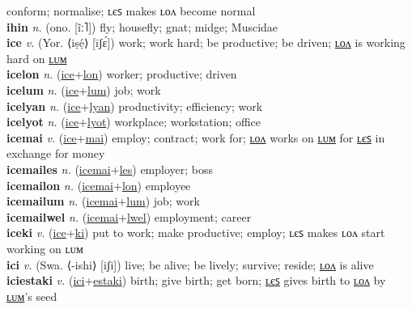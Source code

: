 conform; normalise; ʟєꜱ makes ʟᴏᴧ become normal \label{ihohaki} \\
\textbf{ihin} \textit{n.} (ono. [ĩː˥])
fly; housefly; gnat; midge; Muscidae \label{ihin} \\
\textbf{ice} \textit{v.} (Yor. ⟨iṣẹ́⟩ [īʃɛ́])
work; work hard; be productive; be driven; \hyperref[icelon]{ʟᴏᴧ} is working hard on \hyperref[icelum]{ʟᴜᴍ} \label{ice} \\
\textbf{icelon} \textit{n.} (\hyperref[ice]{ice}+\hyperref[lon]{lon})
worker; productive; driven \label{icelon} \\
\textbf{icelum} \textit{n.} (\hyperref[ice]{ice}+\hyperref[lum]{lum})
job; work \label{icelum} \\
\textbf{icelyan} \textit{n.} (\hyperref[ice]{ice}+\hyperref[lyan]{lyan})
productivity; efficiency; work \label{icelyan} \\
\textbf{icelyot} \textit{n.} (\hyperref[ice]{ice}+\hyperref[lyot]{lyot})
workplace; workstation; office \label{icelyot} \\
\textbf{icemai} \textit{v.} (\hyperref[ice]{ice}+\hyperref[mai]{mai})
employ; contract; work for; \hyperref[icemailon]{ʟᴏᴧ} works on \hyperref[icemailum]{ʟᴜᴍ} for \hyperref[icemailes]{ʟєꜱ} in exchange for money \label{icemai} \\
\textbf{icemailes} \textit{n.} (\hyperref[icemai]{icemai}+\hyperref[les]{les})
employer; boss \label{icemailes} \\
\textbf{icemailon} \textit{n.} (\hyperref[icemai]{icemai}+\hyperref[lon]{lon})
employee \label{icemailon} \\
\textbf{icemailum} \textit{n.} (\hyperref[icemai]{icemai}+\hyperref[lum]{lum})
job; work \label{icemailum} \\
\textbf{icemailwel} \textit{n.} (\hyperref[icemai]{icemai}+\hyperref[lwel]{lwel})
employment; career \label{icemailwel} \\
\textbf{iceki} \textit{v.} (\hyperref[ice]{ice}+\hyperref[ki]{ki})
put to work; make productive; employ; ʟєꜱ makes ʟᴏᴧ start working on ʟᴜᴍ \label{iceki} \\
\textbf{ici} \textit{v.} (Swa. ⟨-ishi⟩ [iʃi])
live; be alive; be lively; survive; reside; \hyperref[icilon]{ʟᴏᴧ} is alive \label{ici} \\
\textbf{iciestaki} \textit{v.} (\hyperref[ici]{ici}+\hyperref[estaki]{estaki})
birth; give birth; get born; \hyperref[iciestakiles]{ʟєꜱ} gives birth to \hyperref[iciestakilon]{ʟᴏᴧ} by \hyperref[iciestakilum]{ʟᴜᴍ}’s seed \label{iciestaki} \\

